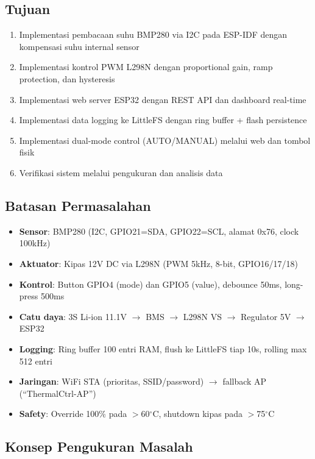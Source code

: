 \documentclass[11pt,a4paper]{article}
\begin{document}
\subsection{Tujuan}

\begin{enumerate}
    \item Implementasi pembacaan suhu BMP280 via I2C pada ESP-IDF dengan kompensasi suhu internal sensor
    \item Implementasi kontrol PWM L298N dengan proportional gain, ramp protection, dan hysteresis
    \item Implementasi web server ESP32 dengan REST API dan dashboard real-time
    \item Implementasi data logging ke LittleFS dengan ring buffer + flash persistence
    \item Implementasi dual-mode control (AUTO/MANUAL) melalui web dan tombol fisik
    \item Verifikasi sistem melalui pengukuran dan analisis data
\end{enumerate}

\subsection{Batasan Permasalahan}

\begin{itemize}
    \item \textbf{Sensor}: BMP280 (I2C, GPIO21=SDA, GPIO22=SCL, alamat 0x76, clock 100kHz)
    \item \textbf{Aktuator}: Kipas 12V DC via L298N (PWM 5kHz, 8-bit, GPIO16/17/18)
    \item \textbf{Kontrol}: Button GPIO4 (mode) dan GPIO5 (value), debounce 50ms, long-press 500ms
    \item \textbf{Catu daya}: 3S Li-ion 11.1V $\rightarrow$ BMS $\rightarrow$ L298N VS $\rightarrow$ Regulator 5V $\rightarrow$ ESP32
    \item \textbf{Logging}: Ring buffer 100 entri RAM, flush ke LittleFS tiap 10s, rolling max 512 entri
    \item \textbf{Jaringan}: WiFi STA (prioritas, SSID/password) $\rightarrow$ fallback AP (``ThermalCtrl-AP'')
    \item \textbf{Safety}: Override 100\% pada $>$60$^{\circ}$C, shutdown kipas pada $>$75$^{\circ}$C
\end{itemize}

\subsection{Konsep Pengukuran Masalah}
\end{document}
